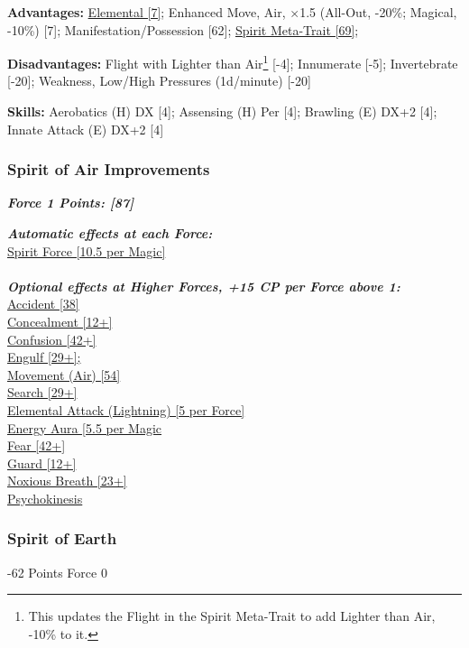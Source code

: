 \begin{multicols}{3}
	\textbf{Advantages:}
	\hyperref[elemental]{Elemental [7]}; Enhanced Move, Air, \(\times\)1.5 (All-Out, -20\%; Magical, -10\%) [7]; Manifestation/Possession [62]; \hyperref[spirit_meta_trait]{Spirit Meta-Trait [69]}; 
	
	\textbf{Disadvantages:}
	Flight with Lighter than Air\footnote{This updates the Flight in the Spirit Meta-Trait to add Lighter than Air, -10\% to it.} [-4]; Innumerate [-5]; Invertebrate [-20]; Weakness, Low/High Pressures (1d/minute) [-20]
	
	\textbf{Skills:}
	Aerobatics (H) DX [4]; Assensing (H) Per [4]; Brawling (E) DX+2 [4]; Innate Attack (E) DX+2 [4]
	
	\subsubsection*{Spirit of Air Improvements}
	
	\textbf{\textit{Force 1 Points: [87]}}
	
	\textbf{\textit{Automatic effects at each Force:\\}}
	\hyperref[spirit_force]{Spirit Force [10.5 per Magic]}\\\\
	
	\textbf{\textit{Optional effects at Higher Forces, +15 CP per Force above 1:\\}}
	\hyperref[accident]{Accident [38]}\\
	\hyperref[concealment]{Concealment [12+]}\\
	\hyperref[confusion]{Confusion [42+]}\\
	\hyperref[engulf]{Engulf [29+];}\\
	\hyperref[movement]{Movement (Air) [54]}\\
	\hyperref[search]{Search [29+]}\\
	\hyperref[elemental_attack]{Elemental Attack (Lightning) [5 per Force]}\\
	\hyperref[energy_aura]{Energy Aura [5.5 per Magic}\\
	\hyperref[fear]{Fear [42+]}\\
	\hyperref[guard]{Guard [12+]}\\
	\hyperref[noxious_breath]{Noxious Breath [23+]}\\
	\hyperref[psychokinesis]{Psychokinesis}\\	
	
	\subsubsection{Spirit of Earth}
	\begin{flushright}
		-62 Points Force 0
	\end{flushright}
	

\end{multicols}
